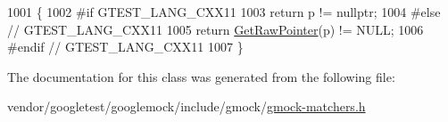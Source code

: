 \begin{DoxyCode}
1001                                                      \{
1002 \textcolor{preprocessor}{#if GTEST\_LANG\_CXX11}
1003     \textcolor{keywordflow}{return} p != \textcolor{keyword}{nullptr};
1004 \textcolor{preprocessor}{#else  // GTEST\_LANG\_CXX11}
1005     \textcolor{keywordflow}{return} \hyperlink{namespacetesting_1_1internal_ae88d1a6f95165c43c27a6c0e2d357e61}{GetRawPointer}(p) != NULL;
1006 \textcolor{preprocessor}{#endif  // GTEST\_LANG\_CXX11}
1007   \}
\end{DoxyCode}


The documentation for this class was generated from the following file\+:\begin{DoxyCompactItemize}
\item 
vendor/googletest/googlemock/include/gmock/\hyperlink{gmock-matchers_8h}{gmock-\/matchers.\+h}\end{DoxyCompactItemize}
